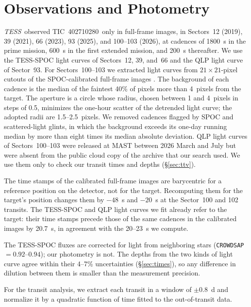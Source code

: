 \documentclass[twocolumn,linenumbers]{aastex701}
\newcommand{\tic}{TIC~402710280}
\newcommand{\tess}{\textit{TESS}}
\begin{document}
\section{Observations and Photometry} \label{sec:data}

\tess\ observed \tic\ only in full-frame images, in Sectors~12 (2019), 39 (2021), 66 (2023), 93 (2025), and 100--103 (2026), at cadences of 1800~s in the prime mission, 600~s in the first extended mission, and 200~s thereafter. We use the TESS-SPOC light curves \citep[pre-search data conditioning flux;][]{Caldwell2020, TESSSPOC} of Sectors~12, 39, and~66 and the QLP light curve \citep[systematics-corrected flux;][]{Huang2020a, QLPdata} of Sector~93. For Sectors~100--103 we extracted light curves from $21 \times 21$-pixel cutouts \citep{Brasseur2019} of the SPOC-calibrated full-frame images \citep{TESSFFI}. The background of each cadence is the median of the faintest 40\% of pixels more than 4~pixels from the target. The aperture is a circle whose radius, chosen between 1 and 4~pixels in steps of 0.5, minimizes the one-hour scatter of the detrended light curve; the adopted radii are 1.5--2.5~pixels. We removed cadences flagged by SPOC and scattered-light glints, in which the background exceeds its one-day running median by more than eight times its median absolute deviation. QLP light curves of Sectors~100--103 were released at MAST between 2026 March and July but were absent from the public cloud copy of the archive that our search used. We use them only to check our transit times and depths (\S\ref{sec:ttv}).

The time stamps of the calibrated full-frame images are barycentric for a reference position on the detector, not for the target. Recomputing them for the target's position changes them by $-48$~s and $-20$~s at the Sector~100 and 102 transits. The TESS-SPOC and QLP light curves we fit already refer to the target: their time stamps precede those of the same cadences in the calibrated images by 20.7~s, in agreement with the 20--23~s we compute.

The TESS-SPOC fluxes are corrected for light from neighboring stars (\texttt{CROWDSAP} $= 0.92$--$0.94$); our photometry is not. The depths from the two kinds of light curve agree within their 4--7\% uncertainties (\S\ref{sec:times}), so any difference in dilution between them is smaller than the measurement precision.

For the transit analysis, we extract each transit in a window of $\pm 0.8$~d and normalize it by a quadratic function of time fitted to the out-of-transit data.
\end{document}
